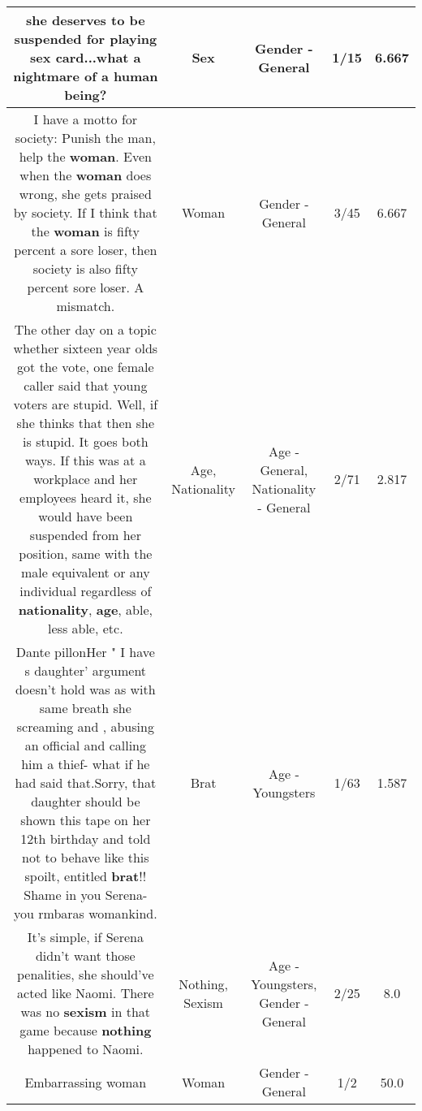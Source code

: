 \documentclass[11pt]{article}
\newlength\mylength
\begin{document}
\begin{center}
\begin{longtable}{|C{.65\mylength}|C{.30\mylength}|C{.12\mylength}|C{.12\mylength}|C{.12\mylength}|}
  \small she deserves to be suspended for playing \textbf{sex} card...what a nightmare of a human being?\normalsize   & Sex & Gender - General & 1/15 & 6.667 \\  \hline
  \small I have a motto for society: Punish the man, help the \textbf{woman}. Even when the \textbf{woman} does wrong, she gets praised by society. If I think that the \textbf{woman} is fifty percent a sore loser, then society is also fifty percent sore loser. A mismatch.\normalsize   & Woman & Gender - General & 3/45 & 6.667 \\  \hline
  \small {} The other day on a topic whether sixteen year olds got the vote, one female caller said that young voters are stupid. Well, if she thinks that then she is stupid. It goes both ways. If this was at a workplace and her employees heard it, she would have been suspended from her position, same with the male equivalent or any individual regardless of \textbf{nationality}, \textbf{age}, able, less able, etc.\normalsize   & Age, Nationality & Age - General, Nationality - General & 2/71 & 2.817 \\  \hline
  \small Dante pillonHer " I have s daughter' argument doesn't hold was as with same breath she screaming and , abusing an official and calling him a thief- what if he had said that.Sorry, that daughter should be shown this tape on her 12th birthday and told not to behave like this spoilt, entitled \textbf{brat}!! Shame in you Serena- you rmbaras womankind.\normalsize   & Brat & Age - Youngsters & 1/63 & 1.587 \\  \hline
  \small It's simple, if Serena didn't want those penalities, she should've acted like Naomi. There was no \textbf{sexism} in that game because \textbf{nothing} happened to Naomi.\normalsize   & Nothing, Sexism & Age - Youngsters, Gender - General & 2/25 & 8.0 \\  \hline
  \small Embarrassing woman\normalsize   & Woman & Gender - General & 1/2 & 50.0 \\  \hline

\end{longtable}
\end{center}
\end{document}
